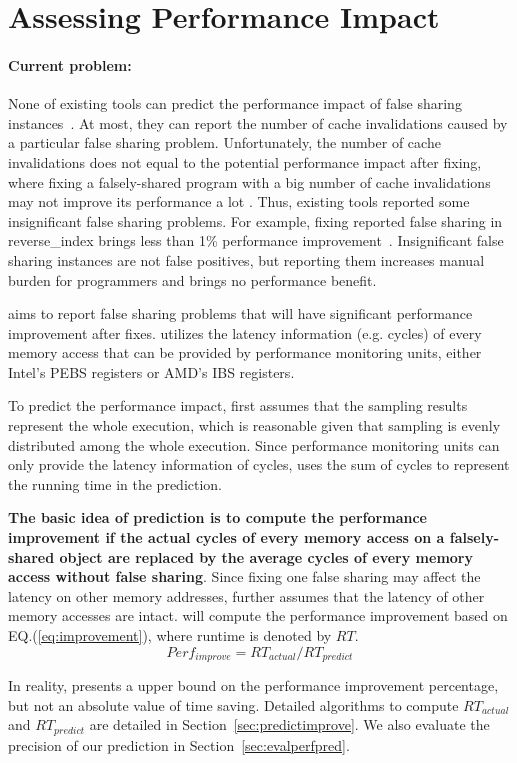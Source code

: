 \section{Assessing Performance Impact}
\label{sec:predictidea}

\paragraph{Current problem:} None of existing tools can predict the performance impact of false sharing instances~\cite{sheriff, Predator, openmp}. At most, they can report the number of cache invalidations caused by a particular false sharing problem. Unfortunately, the number of cache invalidations does not equal to the potential performance impact after fixing, where fixing a falsely-shared program with a big number of cache invalidations may not improve its performance a lot . Thus, existing tools reported some insignificant false sharing problems. For example, fixing reported false sharing in reverse\_index brings less than 1\% performance improvement~\cite{sheriff, Predator}. Insignificant false sharing instances are not false positives, but reporting them increases manual burden for programmers and brings no performance benefit. 

\Cheetah{} aims to report false sharing problems that will have significant performance improvement after fixes. \Cheetah{} utilizes the latency information (e.g. cycles) of every memory access that can be provided by performance monitoring units, either Intel's PEBS registers or AMD's IBS registers. 

To predict the performance impact, \Cheetah{} first assumes that the sampling results represent the whole execution, which is reasonable given that sampling is evenly distributed among the whole execution. Since performance monitoring units can only provide the latency information of cycles, \Cheetah{} uses the sum of cycles to represent the running time in the prediction.  

{\bf The basic idea of prediction is to compute the performance improvement if the actual cycles of every memory access on a
falsely-shared object are replaced by the average cycles of every memory access without false sharing}. Since fixing one false sharing may affect the latency on other memory addresses, \cheetah{} further assumes that the latency of other memory accesses are intact. \cheetah{} will compute the performance improvement based on EQ.(\ref{eq:improvement}), where runtime is denoted by $RT$. 
\begin{equation}
\label{eq:improvement}
Perf_{improve}=RT_{actual}/RT_{predict}
\end{equation} 


In reality, \Cheetah{} presents a upper bound on the performance improvement percentage, but not an absolute value of time saving. 
Detailed algorithms to compute $RT_{actual}$ and $RT_{predict}$ are detailed in Section~\ref{sec:predictimprove}. We also evaluate the precision of our prediction in Section~\ref{sec:evalperfpred}.


